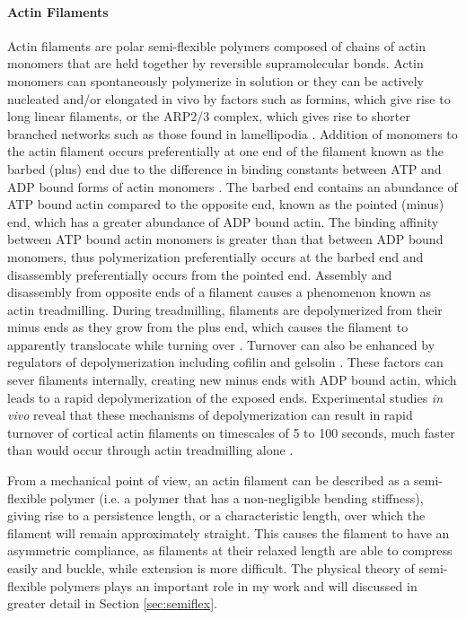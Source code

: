 \paragraph{Actin Filaments} Actin filaments are polar semi-flexible polymers composed of chains of actin monomers that are held together by reversible supramolecular bonds.  Actin monomers can spontaneously polymerize in solution or they can be actively nucleated and/or elongated in vivo by factors such as formins, which give rise to long linear filaments, or the ARP2/3 complex, which gives rise to shorter branched networks such as those found in lamellipodia \cite{phys_bio_cell}.  Addition of monomers to the actin filament occurs preferentially at one end of the filament known as the barbed (plus) end due to the difference in binding constants between ATP and ADP bound forms of actin monomers \cite{doi:10.1146/annurev-biophys-051309-103849}. The barbed end contains an abundance of ATP bound actin compared to the opposite end, known as the pointed (minus) end, which has a greater abundance of ADP bound actin. The binding affinity between ATP bound actin monomers is greater than that between ADP bound monomers, thus polymerization preferentially occurs at the barbed end and disassembly preferentially occurs from the pointed end.  Assembly and disassembly from opposite ends of a filament causes a phenomenon known as actin treadmilling. During treadmilling, filaments are depolymerized from their minus ends as they grow from the plus end, which causes the filament to apparently translocate while turning over \cite{doi:10.1146/annurev-biophys-051309-103849}.  Turnover can also be enhanced by regulators of depolymerization including cofilin and gelsolin \cite{bemenet}. These factors can sever filaments internally, creating new minus ends with ADP bound actin, which leads to a rapid depolymerization of the exposed ends.  Experimental studies \textit{in vivo} reveal that these mechanisms of depolymerization can result in rapid turnover of cortical actin filaments on timescales of 5 to 100 seconds, much faster than would occur through actin treadmilling alone \cite{Robin:2014aa, Fritzsche:2013aa, Fritzschee1501337, Carlsson:2010aa, Lai:2008aa}.   

From a mechanical point of view, an actin filament can be described as a semi-flexible polymer (i.e. a polymer that has a non-negligible bending stiffness), giving rise to a persistence length, or a characteristic length, over which the filament will remain approximately straight.  This causes the filament to have an asymmetric compliance, as filaments at their relaxed length are able to compress easily and buckle, while extension is more difficult.  The physical theory of semi-flexible polymers plays an important role in my work and will discussed in greater detail in Section \ref{sec:semiflex}.


